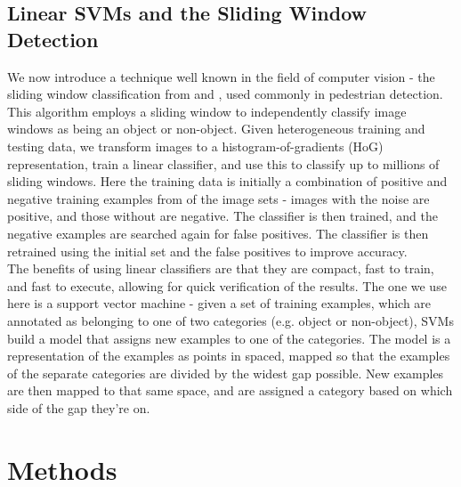 \documentclass[twocolumn,longauthor]{aastex61}
\begin{document}
\subsection{Linear SVMs and the Sliding Window Detection} \label{subsec:window}
\noindent We now introduce a technique well known in the field of computer vision - the sliding window classification from \citet{2005CVPR} and \citet{2009IEEE}, used commonly in pedestrian detection. This algorithm employs a sliding window to independently classify image windows as being an object or non-object. Given heterogeneous training and testing data, we transform images to a histogram-of-gradients (HoG) representation, train a linear classifier, and use this to classify up to millions of sliding windows. Here the training data is initially a combination of positive and negative training examples from of the image sets - images with the noise are positive, and those without are negative. The classifier is then trained, and the negative examples are searched again for false positives. The classifier is then retrained using the initial set and the false positives to improve accuracy.\\
\indent The benefits of using linear classifiers are that they are compact, fast to train, and fast to execute, allowing for quick verification of the results. The one we use here is a support vector machine - given a set of training examples, which are annotated as belonging to one of two categories (e.g. object or non-object), SVMs build a model that assigns new examples to one of the categories. The model is a representation of the examples as points in spaced, mapped so that the examples of the separate categories are divided by the widest gap possible. New examples are then mapped to that same space, and are assigned a category based on which side of the gap they're on.



\section{Methods} \label{sec:methods}
\end{document}
